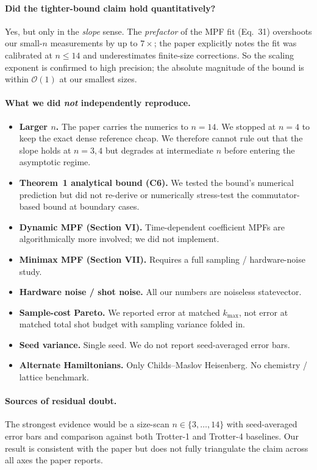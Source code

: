 \documentclass[11pt]{article}
\begin{document}
\paragraph{Did the tighter-bound claim hold quantitatively?}
Yes, but only in the \emph{slope} sense. The \emph{prefactor} of the MPF fit (Eq.~31)
overshoots our small-$n$ measurements by up to $7\times$; the paper explicitly notes the fit
was calibrated at $n \le 14$ and underestimates finite-size corrections. So the scaling
exponent is confirmed to high precision; the absolute magnitude of the bound is within
$\mathcal{O}(1)$ at our smallest sizes.

\paragraph{What we did \emph{not} independently reproduce.}
\begin{itemize}
\item \textbf{Larger $n$.} The paper carries the numerics to $n=14$. We stopped at $n=4$ to keep
      the exact dense reference cheap. We therefore cannot rule out that the slope holds at
      $n=3,4$ but degrades at intermediate $n$ before entering the asymptotic regime.
\item \textbf{Theorem~1 analytical bound (C6).} We tested the bound's numerical prediction but
      did not re-derive or numerically stress-test the commutator-based bound at boundary cases.
\item \textbf{Dynamic MPF (Section VI).} Time-dependent coefficient MPFs are algorithmically more
      involved; we did not implement.
\item \textbf{Minimax MPF (Section VII).} Requires a full sampling / hardware-noise study.
\item \textbf{Hardware noise / shot noise.} All our numbers are noiseless statevector.
\item \textbf{Sample-cost Pareto.} We reported error at matched $k_{\max}$, not error at matched
      total shot budget with sampling variance folded in.
\item \textbf{Seed variance.} Single seed. We do not report seed-averaged error bars.
\item \textbf{Alternate Hamiltonians.} Only Childs--Maslov Heisenberg. No chemistry / lattice
      benchmark.
\end{itemize}

\paragraph{Sources of residual doubt.}
The strongest evidence would be a size-scan $n \in \{3,\ldots,14\}$ with seed-averaged error bars
and comparison against both Trotter-1 and Trotter-4 baselines. Our result is consistent with
the paper but does not fully triangulate the claim across all axes the paper reports.
\end{document}
